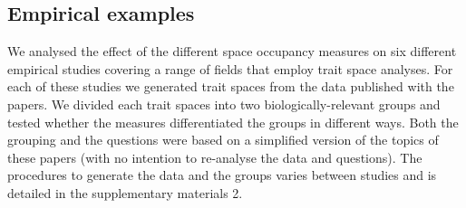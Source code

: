 \documentclass[]{article}
\begin{document}
\subsection{Empirical examples}\label{empirical-examples}

We analysed the effect of the different space occupancy measures on six
different empirical studies covering a range of fields that employ trait
space analyses. For each of these studies we generated trait spaces from
the data published with the papers. We divided each trait spaces into
two biologically-relevant groups and tested whether the measures
differentiated the groups in different ways. Both the grouping and the
questions were based on a simplified version of the topics of these
papers (with no intention to re-analyse the data and questions). The
procedures to generate the data and the groups varies between studies
and is detailed in the supplementary materials 2.

\renewcommand\baselinestretch{1}\selectfont
\end{document}
